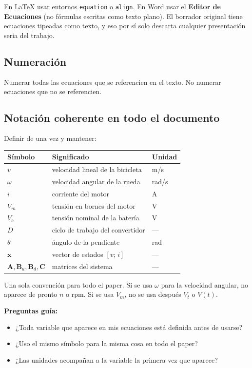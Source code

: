 \documentclass[11pt,a4paper]{article}
\begin{document}
En LaTeX usar entornos \texttt{equation} o \texttt{align}. En Word usar el \textbf{Editor de Ecuaciones} (no fórmulas escritas como texto plano). El borrador original tiene ecuaciones tipeadas como texto, y eso por sí solo descarta cualquier presentación seria del trabajo.

\subsection{Numeración}

Numerar todas las ecuaciones que se referencien en el texto. No numerar ecuaciones que no se referencien.

\subsection{Notación coherente en todo el documento}

Definir de una vez y mantener:

\begin{table}[h]
\centering
\begin{tabular}{l l l}
\toprule
Símbolo & Significado & Unidad \\
\midrule
$v$ & velocidad lineal de la bicicleta & m/s \\
$\omega$ & velocidad angular de la rueda & rad/s \\
$i$ & corriente del motor & A \\
$V_m$ & tensión en bornes del motor & V \\
$V_b$ & tensión nominal de la batería & V \\
$D$ & ciclo de trabajo del convertidor & --- \\
$\theta$ & ángulo de la pendiente & rad \\
$\mathbf{x}$ & vector de estados $[v;\,i]$ & --- \\
$\mathbf{A},\mathbf{B}_u,\mathbf{B}_d,\mathbf{C}$ & matrices del sistema & --- \\
\bottomrule
\end{tabular}
\end{table}

Una sola convención para todo el paper. Si se usa $\omega$ para la velocidad angular, no aparece de pronto $n$ o rpm. Si se usa $V_m$, no se usa después $V_t$ o $V(t)$.

\begin{guia}
\textbf{Preguntas guía:}
\begin{itemize}
    \item ¿Toda variable que aparece en mis ecuaciones está definida antes de usarse?
    \item ¿Uso el mismo símbolo para la misma cosa en todo el paper?
    \item ¿Las unidades acompañan a la variable la primera vez que aparece?
\end{itemize}
\end{guia}
\end{document}
